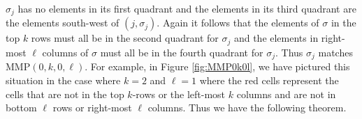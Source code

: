 \documentclass[
final,nomarks
]{dmtcs-episciences}
\newcommand{\MMP}{\mathrm{MMP}}
\begin{document}
\begin{math}\sigma_j\end{math} has no elements in its first quadrant and the elements in its third quadrant 
are the elements south-west of \begin{math}(j,\sigma_j)\end{math}.  Again it follows that 
the elements of \begin{math}\sigma\end{math} in the top \begin{math}k\end{math} rows must all be in the second quadrant for \begin{math}\sigma_j\end{math} 
and the elements in right-most \begin{math}\ell\end{math} columns of \begin{math}\sigma\end{math} must all be in the fourth quadrant for \begin{math}\sigma_j\end{math}. 
Thus \begin{math}\sigma_j\end{math} matches \begin{math}\MMP(0,k,0,\ell)\end{math}. For example, in Figure \ref{fig:MMP0k0l}, we have pictured 
this situation in the case where \begin{math}k=2\end{math} and \begin{math}\ell =1\end{math} where the red cells represent 
the cells that are not in the top \begin{math}k\end{math}-rows or the left-most 
\begin{math}k\end{math} columns and are not in bottom \begin{math}\ell\end{math} rows or right-most \begin{math}\ell\end{math} columns. Thus we 
have the following theorem.
\end{document}
